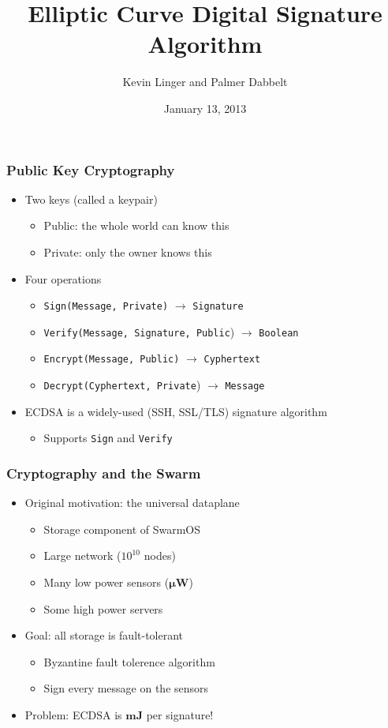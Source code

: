 \documentclass{beamer}
\title{Elliptic Curve Digital Signature Algorithm}
\author{Kevin Linger and Palmer Dabbelt}
\date{January 13, 2013}
\begin{document}
\maketitle

\begin{frame}
  \frametitle{Public Key Cryptography}


  \begin{itemize}
  \item Two keys (called a keypair)
    \begin{itemize}
    \item Public: the whole world can know this
    \item Private: only the owner knows this
    \end{itemize}
  \item Four operations
    \begin{itemize}
    \item \texttt{Sign(Message, Private)} $\rightarrow$ \texttt{Signature}
    \item \texttt{Verify(Message, Signature, Public}) $\rightarrow$ \texttt{Boolean}
    \item \texttt{Encrypt(Message, Public)} $\rightarrow$ \texttt{Cyphertext}
    \item \texttt{Decrypt(Cyphertext, Private}) $\rightarrow$ \texttt{Message}
    \end{itemize}
  \item ECDSA is a widely-used (SSH, SSL/TLS) signature algorithm
    \begin{itemize}
    \item Supports \texttt{Sign} and \texttt{Verify}
    \end{itemize}
  \end{itemize}
\end{frame}

\begin{frame}
  \frametitle{Cryptography and the Swarm}

  \begin{itemize}
  \item Original motivation: the universal dataplane
    \begin{itemize}
      \item Storage component of SwarmOS
      \item Large network ($10^{10}$ nodes)
      \item Many low power sensors ($\bm{\mu} \mathbf{W}$)
      \item Some high power servers
    \end{itemize}
  \item Goal: all storage is fault-tolerant
    \begin{itemize}
    \item Byzantine fault tolerence algorithm
    \item Sign every message on the sensors
    \end{itemize}
  \item Problem: ECDSA is $\mathbf{mJ}$ per signature!
  \end{itemize}
\end{frame}
\end{document}
